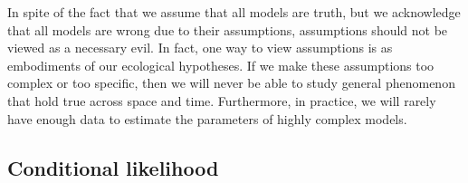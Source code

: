 In spite of the fact that we assume that all models are truth, but we
acknowledge that all models are wrong due to their assumptions,
assumptions should not be viewed as a necessary evil. In fact, one way
to view assumptions is as embodiments of our ecological hypotheses. If
we make these assumptions too complex or too specific, then we will
never be able to study general phenomenon that hold true across space
and time. Furthermore, in practice, we will rarely have enough data to estimate the
parameters of highly complex models.

\subsection{Conditional likelihood}


